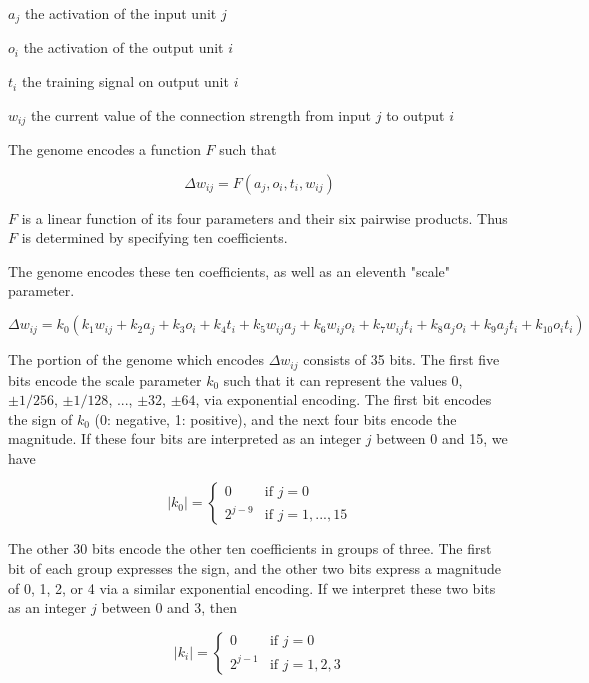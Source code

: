 \documentclass[master]{outhesis}
\begin{document}
\begin{center}
	$a_j$ the activation of the input unit $j$
\end{center}

\begin{center}
	$o_i$ the activation of the output unit $i$
\end{center}

\begin{center}
	$t_i$ the training signal on output unit $i$
\end{center}

\begin{center}
	$w_{ij}$ the current value of the connection strength from input $j$ to output $i$
\end{center}

The genome encodes a function $F$ such that

\[
	\Delta w_{ij} = F(a_j, o_i, t_i, w_{ij})
\]

$F$ is a linear function of its four parameters and their six pairwise products. Thus $F$ is determined by specifying ten coefficients.

The genome encodes these ten coefficients, as well as an eleventh "scale" parameter.

\[
	\Delta w_{ij} = k_0(k_1w_{ij}+k_2a_j+k_3o_i+k_4t_i+k_5w_{ij}a_j+k_6w_{ij}o_i+k_7w_{ij}t_{i}+k_8a_jo_i+k_9a_jt_i+k_{10}o_it_i)
\]

The portion of the genome which encodes $\Delta w_{ij}$ consists of 35 bits. The first five bits encode the scale parameter $k_0$ such that it can represent the values $0$, $\pm 1/256$, $\pm 1/128$, ..., $\pm 32$, $\pm 64$, via exponential encoding. The first bit encodes the sign of $k_0$ (0: negative, 1: positive), and the next four bits encode the magnitude. If these four bits are interpreted as an integer $j$ between 0 and 15, we have

\[
	|k_0|=
	\begin{cases}
		0 & \text{if $j = 0$}\\
		2^{j-9} & \text{if $j = 1, ..., 15$}
	\end{cases}
\]

The other 30 bits encode the other ten coefficients in groups of three. The first bit of each group expresses the sign, and the other two bits express a magnitude of 0, 1, 2, or 4 via a similar exponential encoding. If we interpret these two bits as an integer $j$ between 0 and 3, then

\[
	|k_i|=
	\begin{cases}
		0 & \text{if $j = 0$}\\
		2^{j-1} & \text{if $j = 1, 2, 3$}
	\end{cases}
\]
\end{document}
